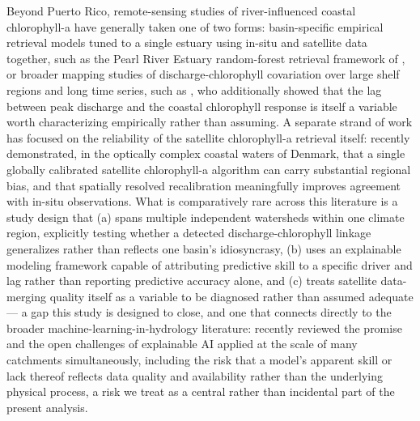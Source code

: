 \documentclass[preprint,12pt]{elsarticle}
\begin{document}
Beyond Puerto Rico, remote-sensing studies of river-influenced coastal chlorophyll-a have generally taken one of two forms: basin-specific empirical retrieval models tuned to a single estuary using in-situ and satellite data together, such as the Pearl River Estuary random-forest retrieval framework of \citet{yuan2022spatiotemporal}, or broader mapping studies of discharge-chlorophyll covariation over large shelf regions and long time series, such as \citet{auricht2022mapping}, who additionally showed that the lag between peak discharge and the coastal chlorophyll response is itself a variable worth characterizing empirically rather than assuming. A separate strand of work has focused on the reliability of the satellite chlorophyll-a retrieval itself: \citet{holbach2025chlorophyll} recently demonstrated, in the optically complex coastal waters of Denmark, that a single globally calibrated satellite chlorophyll-a algorithm can carry substantial regional bias, and that spatially resolved recalibration meaningfully improves agreement with in-situ observations. What is comparatively rare across this literature is a study design that (a) spans multiple independent watersheds within one climate region, explicitly testing whether a detected discharge-chlorophyll linkage generalizes rather than reflects one basin's idiosyncrasy, (b) uses an explainable modeling framework capable of attributing predictive skill to a specific driver and lag rather than reporting predictive accuracy alone, and (c) treats satellite data-merging quality itself as a variable to be diagnosed rather than assumed adequate --- a gap this study is designed to close, and one that connects directly to the broader machine-learning-in-hydrology literature: \citet{slater2025challenges} recently reviewed the promise and the open challenges of explainable AI applied at the scale of many catchments simultaneously, including the risk that a model's apparent skill or lack thereof reflects data quality and availability rather than the underlying physical process, a risk we treat as a central rather than incidental part of the present analysis.
\end{document}
